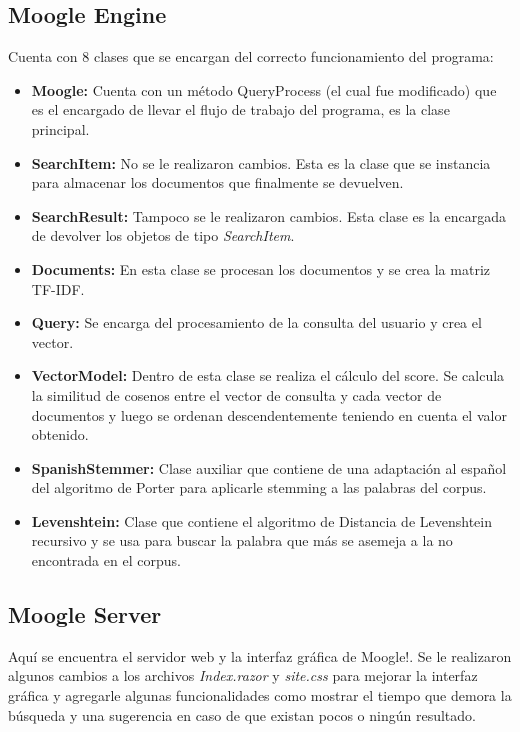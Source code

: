 \documentclass{article}
\begin{document}
\subsection{Moogle Engine}
Cuenta con 8 clases que se encargan del correcto funcionamiento del programa:
\begin{itemize}

\item \textbf{Moogle:} Cuenta con un método QueryProcess (el cual fue modificado) que es el encargado de llevar el flujo de trabajo del programa, es la clase principal.

\item \textbf{SearchItem:} No se le realizaron cambios. Esta es la clase que se instancia para almacenar los documentos que finalmente se devuelven.

\item \textbf{SearchResult:} Tampoco se le realizaron cambios. Esta clase es la encargada de devolver los objetos de tipo \textit{SearchItem}.

\item \textbf{Documents:} En esta clase se procesan los documentos y se crea la matriz TF-IDF.

\item \textbf{Query:} Se encarga del procesamiento de la consulta del usuario y crea el vector.

\item \textbf{VectorModel:} Dentro de esta clase se realiza el cálculo del score. Se calcula la similitud de cosenos entre el vector de consulta y cada vector de documentos y luego se ordenan descendentemente teniendo en cuenta el valor obtenido.

\item \textbf{SpanishStemmer:} Clase auxiliar que contiene de una adaptación al español del algoritmo de Porter para aplicarle stemming a las palabras del corpus.

\item \textbf{Levenshtein:} Clase que contiene el algoritmo de Distancia de Levenshtein recursivo y se usa para buscar la palabra que más se asemeja a la no encontrada en el corpus.

\end{itemize}

\subsection{Moogle Server}

Aquí se encuentra el servidor web y la interfaz gráfica de Moogle!. Se le realizaron algunos cambios a los archivos \textit{Index.razor} y \textit{site.css} para mejorar la interfaz gráfica y agregarle algunas funcionalidades como mostrar el tiempo que demora la búsqueda y una sugerencia en caso de que existan pocos o ningún resultado.
\end{document}
